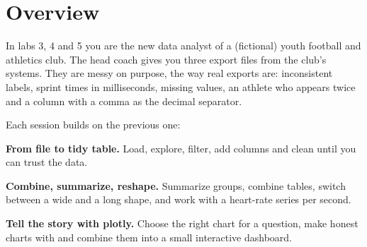 \section{Overview}

In labs 3, 4 and 5 you are the new data analyst of a (fictional) youth
football and athletics club. The head coach gives you three export files
from the club's systems. They are messy on purpose, the way real exports
are: inconsistent labels, sprint times in milliseconds, missing values,
an athlete who appears twice and a column with a comma as the decimal
separator.

Each session builds on the previous one:

\begin{description}[leftmargin=1.6cm, style=nextline]
  \item[Lab 3] \textbf{From file to tidy table.} Load, explore, filter,
    add columns and clean until you can trust the data.
  \item[Lab 4] \textbf{Combine, summarize, reshape.} Summarize groups,
    combine tables, switch between a wide and a long shape, and work with
    a heart-rate series per second.
  \item[Lab 5] \textbf{Tell the story with plotly.} Choose the right chart
    for a question, make honest charts with  and
    combine them into a small interactive dashboard.
\end{description}

